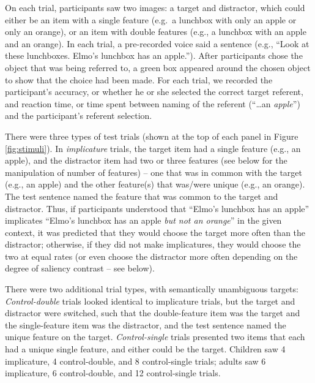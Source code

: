 \documentclass[mask,man]{apa6}
\theoremstyle{definition}
\theoremstyle{definition}
\theoremstyle{definition}
\theoremstyle{remark}
\begin{document}
On each trial, participants saw two images: a target and distractor,
which could either be an item with a single feature (e.g.~a lunchbox
with only an apple or only an orange), or an item with double features
(e.g., a lunchbox with an apple and an orange). In each trial, a
pre-recorded voice said a sentence (e.g., \enquote{Look at these
lunchboxes. Elmo's lunchbox has an apple.}). After participants chose
the object that was being referred to, a green box appeared around the
chosen object to show that the choice had been made. For each trial, we
recorded the participant's accuracy, or whether he or she selected the
correct target referent, and reaction time, or time spent between naming
of the referent (\enquote{\ldots{}an \emph{apple}}) and the
participant's referent selection.

There were three types of test trials (shown at the top of each panel in
Figure \ref{fig:stimuli}). In \emph{implicature} trials, the target item
had a single feature (e.g., an apple), and the distractor item had two
or three features (see below for the manipulation of number of features)
-- one that was in common with the target (e.g., an apple) and the other
feature(s) that was/were unique (e.g., an orange). The test sentence
named the feature that was common to the target and distractor. Thus, if
participants understood that \enquote{Elmo's lunchbox has an apple}
implicates \enquote{Elmo's lunchbox has an apple \emph{but not an
orange}} in the given context, it was predicted that they would choose
the target more often than the distractor; otherwise, if they did not
make implicatures, they would choose the two at equal rates (or even
choose the distractor more often depending on the degree of saliency
contrast -- see below).

There were two additional trial types, with semantically unambiguous
targets: \emph{Control-double} trials looked identical to implicature
trials, but the target and distractor were switched, such that the
double-feature item was the target and the single-feature item was the
distractor, and the test sentence named the unique feature on the
target. \emph{Control-single} trials presented two items that each had a
unique single feature, and either could be the target. Children saw 4
implicature, 4 control-double, and 8 control-single trials; adults saw 6
implicature, 6 control-double, and 12 control-single trials.
\end{document}
